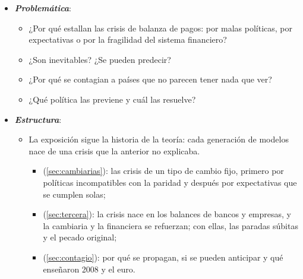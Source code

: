 \documentclass[11pt]{article}
\begin{document}
\begin{itemize}
\item \textbf{\emph{Problemática}}:
  \begin{itemize}
  \item ¿Por qué estallan las crisis de balanza de pagos: por malas políticas, por expectativas o por la fragilidad del sistema financiero?
  \item ¿Son inevitables? ¿Se pueden predecir?
  \item ¿Por qué se contagian a países que no parecen tener nada que ver?
  \item ¿Qué política las previene y cuál las resuelve?
  \end{itemize}

\item \textbf{\emph{Estructura}}:
  \begin{itemize}
  \item La exposición sigue la historia de la teoría: cada generación de modelos nace de una crisis que la anterior no explicaba.
    \begin{itemize}
    \item {} (\ref{sec:cambiarias}): las crisis de un tipo de cambio fijo, primero por políticas incompatibles con la paridad y después por expectativas que se cumplen solas;
    \item {} (\ref{sec:tercera}): la crisis nace en los balances de bancos y empresas, y la cambiaria y la financiera se refuerzan; con ellas, las paradas súbitas y el pecado original;
    \item {} (\ref{sec:contagio}): por qué se propagan, si se pueden anticipar y qué enseñaron 2008 y el euro.
    \end{itemize}
  \end{itemize}
\end{itemize}
\end{document}
